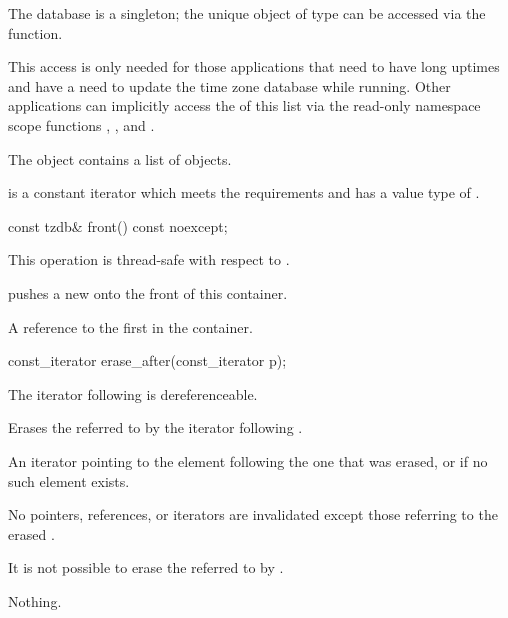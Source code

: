 \pnum
The  database is a singleton;
the unique object of type  can be
accessed via the  function.
\begin{note}
This access is only needed for those applications
that need to have long uptimes and
have a need to update the time zone database while running.
Other applications can implicitly access the  of this list
via the read-only namespace scope functions
,
, and
.
\end{note}
The  object contains a list of  objects.

\pnum
{} is a constant iterator
which meets the  requirements
and has a value type of .

%
\begin{itemdecl}
const tzdb& front() const noexcept;
\end{itemdecl}

\begin{itemdescr}
\pnum
\sync
This operation is thread-safe with respect to .
\begin{note}
 pushes a new 
onto the front of this container.
\end{note}

\pnum
\returns
A reference to the first  in the container.
\end{itemdescr}

%
\begin{itemdecl}
const_iterator erase_after(const_iterator p);
\end{itemdecl}

\begin{itemdescr}
\pnum
\expects
The iterator following  is dereferenceable.

\pnum
\effects
Erases the  referred to by the iterator following .

\pnum
\returns
An iterator pointing to the element following the one that was erased,
or  if no such element exists.

\pnum
\ensures
No pointers, references, or iterators are invalidated
except those referring to the erased .
\begin{note}
It is not possible to erase the 
referred to by .
\end{note}

\pnum
\throws
Nothing.
\end{itemdescr}


